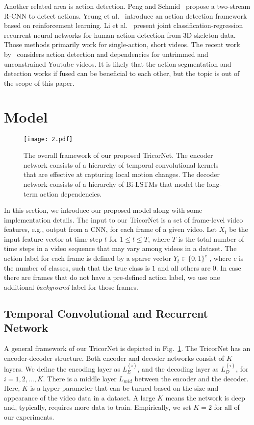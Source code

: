 \documentclass{article}
\begin{document}
Another related area is action detection. Peng and Schmid~\cite{PeScECCV2016} propose a two-stream R-CNN to detect actions. Yeung et al.~\cite{YeRuMoCVPR2016} introduce an action detection framework based on reinforcement learning. Li et al.~\cite{LiLaXiECCV2016} present joint classification-regression recurrent neural networks for human action detection from 3D skeleton data. Those methods primarily work for single-action, short videos. The recent work by~\cite{ZhXuCoARXIV2017} considers action detection and dependencies for untrimmed and unconstrained Youtube videos. It is likely that the action segmentation and detection works if fused can be beneficial to each other, but the topic is out of the scope of this paper.

\section{Model}
\label{sec:model}

\begin{figure}[t]
\centering
\texttt{[image: 2.pdf]}
\caption{The overall framework of our proposed TricorNet. The encoder network consists of a hierarchy of temporal convolutional kernels that are effective at capturing local motion changes. The decoder network consists of a hierarchy of Bi-LSTMs that model the long-term action dependencies.}
\label{f2}
\end{figure}

In this section, we introduce our proposed model along with some implementation details. The input to our TricorNet is a set of frame-level video features, e.g., output from a CNN, for each frame of a given video. Let $X_t$ be the input feature vector at time step $t$ for $1 \leq t \leq T$, where $T$ is the total number of time steps in a video sequence that may vary among videos in a dataset. The action label for each frame is defined by a sparse vector $Y_t \in \{0, 1\}^c$ , where $c$ is the number of classes, such that the true class is $1$ and all others are $0$. In case there are frames that do not have a pre-defined action label, we use one additional \textit{background} label for those frames.

\subsection{Temporal Convolutional and Recurrent Network}

A general framework of our TricorNet is depicted in Fig.~\ref{f2}. The TricorNet has an encoder-decoder structure. Both encoder and decoder networks consist of $K$ layers. We define the encoding layer as $L_{E}^{(i)}$, and the decoding layer as $L_{D}^{(i)}$, for $i = 1,2,\dots,K$. There is a middle layer $L_{mid}$ between the encoder and the decoder. Here, $K$ is a hyper-parameter that can be turned based on the size and appearance of the video data in a dataset. A large $K$ means the network is deep and, typically, requires more data to train. Empirically, we set $K=2$ for all of our experiments. 
\end{document}
